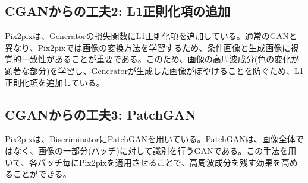 \documentclass{ltjsarticle}
\begin{document}
\subsection{CGANからの工夫2: L1正則化項の追加}
Pix2pixは、Generatorの損失関数にL1正則化項を追加している。通常のGANと異なり、Pix2pixでは画像の変換方法を学習するため、条件画像と生成画像に視覚的一致性があることが重要である。このため、画像の高周波成分(色の変化が顕著な部分)を学習し、Generatorが生成した画像がぼやけることを防ぐため、L1正則化項を追加している。

\subsection{CGANからの工夫3: PatchGAN}
Pix2pixは、DiscriminatorにPatchGANを用いている。PatchGANは、画像全体ではなく、画像の一部分(パッチ)に対して識別を行うGANである。この手法を用いて、各パッチ毎にPix2pixを適用させることで、高周波成分を残す効果を高めることができる。

\newpage
\end{document}

